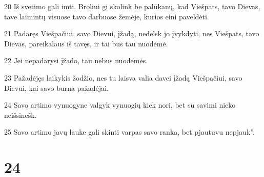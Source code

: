 \par 20 Iš svetimo gali imti. Broliui gi skolink be palūkanų, kad Viešpats, tavo Dievas, tave laimintų visuose tavo darbuose žemėje, kurios eini paveldėti. 
\par 21 Padaręs Viešpačiui, savo Dievui, įžadą, nedelsk jo įvykdyti, nes Viešpats, tavo Dievas, pareikalaus iš tavęs, ir tai bus tau nuodėmė. 
\par 22 Jei nepadarysi įžado, tau nebus nuodėmės. 
\par 23 Pažadėjęs laikykis žodžio, nes tu laisva valia davei įžadą Viešpačiui, savo Dievui, kai savo burna pažadėjai. 
\par 24 Savo artimo vynuogyne valgyk vynuogių kiek nori, bet su savimi nieko neišsinešk. 
\par 25 Savo artimo javų lauke gali skinti varpas savo ranka, bet pjautuvu nepjauk”.



\chapter{24}

